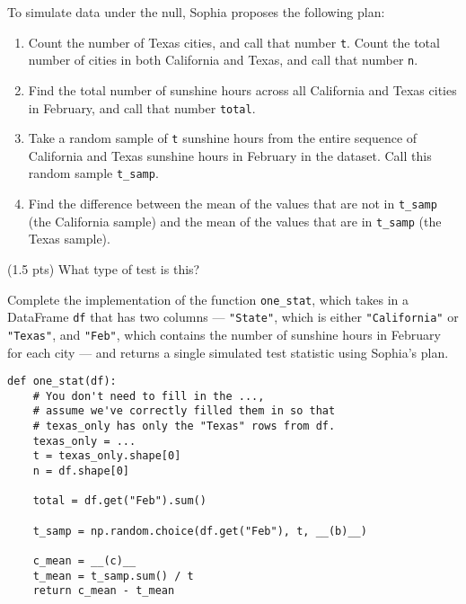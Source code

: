 \begin{prob}[(8 pts)]
To simulate data under the null, Sophia proposes the following plan:
\begin{enumerate}
    \item Count the number of Texas cities, and call that number \texttt{t}. Count the total number of cities in both California and Texas, and call that number \texttt{n}.
    \item Find the total number of sunshine hours across all California and Texas cities in February, and call that number \texttt{total}.
    \item Take a random sample of \texttt{t} sunshine hours from the entire sequence of California and Texas sunshine hours in February in the dataset. Call this random sample \texttt{t\_samp}.
    \item Find the difference between the mean of the values that are not in \texttt{t\_samp} (the California sample) and the mean of the values that are in \texttt{t\_samp} (the Texas sample).
\end{enumerate}

\begin{subprobset}

\begin{subprob}(1.5 pts) What type of test is this?

    
\end{subprob}
    
\end{subprobset}


\newpage

Complete the implementation of the function \texttt{one\_stat}, which takes in a DataFrame \texttt{df} that has two columns --- \texttt{"State"}, which is either \texttt{"California"} or \texttt{"Texas"}, and \texttt{"Feb"}, which contains the number of sunshine hours in February for each city --- and returns a single simulated test statistic using Sophia's plan.

\begin{verbatim}
def one_stat(df):
    # You don't need to fill in the ...,
    # assume we've correctly filled them in so that
    # texas_only has only the "Texas" rows from df.
    texas_only = ...
    t = texas_only.shape[0]
    n = df.shape[0]
    
    total = df.get("Feb").sum()
    
    t_samp = np.random.choice(df.get("Feb"), t, __(b)__)
    
    c_mean = __(c)__
    t_mean = t_samp.sum() / t
    return c_mean - t_mean
\end{verbatim}


\end{prob}
